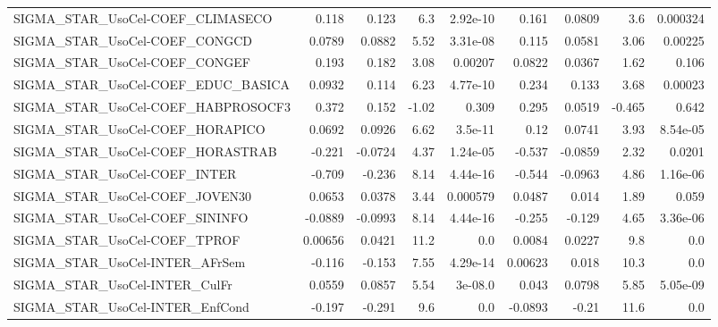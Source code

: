 \begin{tabular}{lrrrrrrrr}
SIGMA\_STAR\_UsoCel-COEF\_CLIMASECO      &       0.118 &        0.123 &      6.3 & 2.92e-10 &      0.161 &      0.0809 &          3.6 &      0.000324 \\
SIGMA\_STAR\_UsoCel-COEF\_CONGCD         &      0.0789 &       0.0882 &     5.52 & 3.31e-08 &      0.115 &      0.0581 &         3.06 &       0.00225 \\
SIGMA\_STAR\_UsoCel-COEF\_CONGEF         &       0.193 &        0.182 &     3.08 &  0.00207 &     0.0822 &      0.0367 &         1.62 &         0.106 \\
SIGMA\_STAR\_UsoCel-COEF\_EDUC\_BASICA    &      0.0932 &        0.114 &     6.23 & 4.77e-10 &      0.234 &       0.133 &         3.68 &       0.00023 \\
SIGMA\_STAR\_UsoCel-COEF\_HABPROSOCF3    &       0.372 &        0.152 &    -1.02 &    0.309 &      0.295 &      0.0519 &       -0.465 &         0.642 \\
SIGMA\_STAR\_UsoCel-COEF\_HORAPICO       &      0.0692 &       0.0926 &     6.62 &  3.5e-11 &       0.12 &      0.0741 &         3.93 &      8.54e-05 \\
SIGMA\_STAR\_UsoCel-COEF\_HORASTRAB      &      -0.221 &      -0.0724 &     4.37 & 1.24e-05 &     -0.537 &     -0.0859 &         2.32 &        0.0201 \\
SIGMA\_STAR\_UsoCel-COEF\_INTER          &      -0.709 &       -0.236 &     8.14 & 4.44e-16 &     -0.544 &     -0.0963 &         4.86 &      1.16e-06 \\
SIGMA\_STAR\_UsoCel-COEF\_JOVEN30        &      0.0653 &       0.0378 &     3.44 & 0.000579 &     0.0487 &       0.014 &         1.89 &         0.059 \\
SIGMA\_STAR\_UsoCel-COEF\_SININFO        &     -0.0889 &      -0.0993 &     8.14 & 4.44e-16 &     -0.255 &      -0.129 &         4.65 &      3.36e-06 \\
SIGMA\_STAR\_UsoCel-COEF\_TPROF          &     0.00656 &       0.0421 &     11.2 &      0.0 &     0.0084 &      0.0227 &          9.8 &           0.0 \\
SIGMA\_STAR\_UsoCel-INTER\_AFrSem        &      -0.116 &       -0.153 &     7.55 & 4.29e-14 &    0.00623 &       0.018 &         10.3 &           0.0 \\
SIGMA\_STAR\_UsoCel-INTER\_CulFr         &      0.0559 &       0.0857 &     5.54 &  3e-08.0 &      0.043 &      0.0798 &         5.85 &      5.05e-09 \\
SIGMA\_STAR\_UsoCel-INTER\_EnfCond       &      -0.197 &       -0.291 &      9.6 &      0.0 &    -0.0893 &       -0.21 &         11.6 &           0.0 \\

\end{tabular}
